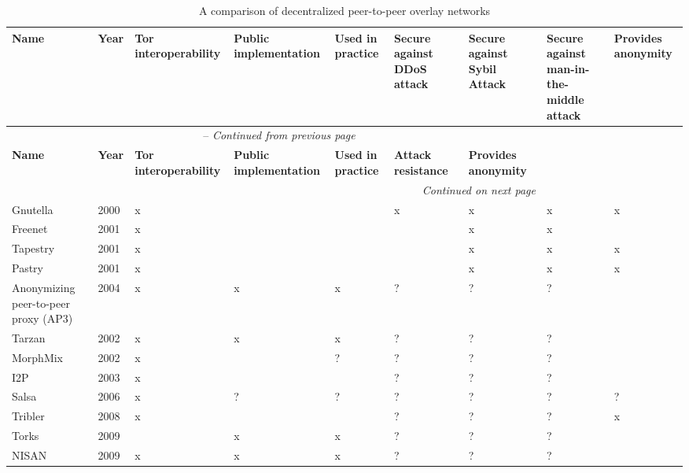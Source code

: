 \begin{landscape}

\begin{center}
    \begin{longtable}{ | p{1.9cm} | p{0.8cm} | p{1.6cm} | p{2.2cm} | p{2.2cm} | p{2.5cm} | p{2.5cm} | p{2.5cm} | p{2cm} | }
  		\caption{A comparison of decentralized peer-to-peer overlay networks} \\ \hline
	    \textbf{Name} & \textbf{Year} & \textbf{Tor interoperability} & \textbf{Public implementation} & \textbf{Used in practice} & \textbf{Secure against DDoS attack} & \textbf{Secure against Sybil Attack} & \textbf{Secure against man-in-the-middle attack} & \textbf{Provides anonymity} \\ \hline
		\endfirsthead
		\multicolumn{7}{c}{\tablename\ \thetable\ -- \textit{Continued from previous page}} \\ \hline
	    \textbf{Name} & \textbf{Year} & \textbf{Tor interoperability} & \textbf{Public implementation} & \textbf{Used in practice} & \textbf{Attack resistance} & \textbf{Provides anonymity} \\ \hline
		\endhead
		\hline \multicolumn{7}{r}{\textit{Continued on next page}} \\
		\endfoot
		\hline
		\endlastfoot
	    
		Gnutella & 2000 & x & \checkmark & \checkmark & x & x & x & x \\ \hline
		Freenet & 2001 & x & \checkmark & \checkmark & \checkmark & x & x & \checkmark\\ \hline
		Tapestry & 2001 & x & \checkmark & \checkmark & \checkmark & x & x & x \\ \hline
		Pastry & 2001 & x & \checkmark & \checkmark & \checkmark & x & x & x \\ \hline
		Anonymizing peer-to-peer proxy (AP3) & 2004 & x & x & x & ? & ? & ? & \checkmark\\ \hline
		Tarzan & 2002 & x & x & x & ? & ? & ? & \checkmark\\ \hline
		MorphMix & 2002 & x & \checkmark & ? & ? & ? & ? & \checkmark \\ \hline
		I2P & 2003 & x & \checkmark & \checkmark & ? & ? & ? & \checkmark\\ \hline
		Salsa & 2006 & x & ? & ? & ? & ? & ? & ?\\ \hline
		Tribler & 2008 & x & \checkmark & \checkmark & ? & ? & ? & x\\ \hline
		Torks & 2009 & \checkmark & x & x & ? & ? & ? & \checkmark\\ \hline
		NISAN & 2009 & x & x & x & ? & ? & ? & \checkmark\\ \hline
    \end{longtable}
\end{center}

\end{landscape}